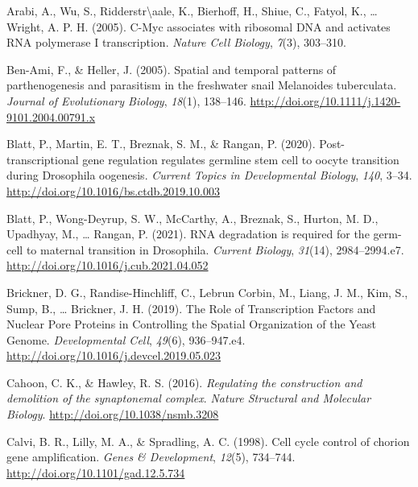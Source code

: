 \documentclass[12pt,oneside]{reedthesis}
\begin{document}
\leavevmode\hypertarget{ref-arabiCMycAssociatesRibosomal2005}{}%
Arabi, A., Wu, S., Ridderstr\textbackslash aale, K., Bierhoff, H., Shiue, C., Fatyol, K., \ldots{} Wright, A. P. H. (2005). C-Myc associates with ribosomal DNA and activates RNA polymerase I transcription. \emph{Nature Cell Biology}, \emph{7}(3), 303--310.

\leavevmode\hypertarget{ref-ben-amiSpatialTemporalPatterns2005}{}%
Ben-Ami, F., \& Heller, J. (2005). Spatial and temporal patterns of parthenogenesis and parasitism in the freshwater snail Melanoides tuberculata. \emph{Journal of Evolutionary Biology}, \emph{18}(1), 138--146. \url{http://doi.org/10.1111/j.1420-9101.2004.00791.x}

\leavevmode\hypertarget{ref-blattPosttranscriptionalGeneRegulation2020}{}%
Blatt, P., Martin, E. T., Breznak, S. M., \& Rangan, P. (2020). Post-transcriptional gene regulation regulates germline stem cell to oocyte transition during Drosophila oogenesis. \emph{Current Topics in Developmental Biology}, \emph{140}, 3--34. \url{http://doi.org/10.1016/bs.ctdb.2019.10.003}

\leavevmode\hypertarget{ref-blattRNADegradationRequired2021}{}%
Blatt, P., Wong-Deyrup, S. W., McCarthy, A., Breznak, S., Hurton, M. D., Upadhyay, M., \ldots{} Rangan, P. (2021). RNA degradation is required for the germ-cell to maternal transition in Drosophila. \emph{Current Biology}, \emph{31}(14), 2984--2994.e7. \url{http://doi.org/10.1016/j.cub.2021.04.052}

\leavevmode\hypertarget{ref-bricknerRoleTranscriptionFactors2019}{}%
Brickner, D. G., Randise-Hinchliff, C., Lebrun Corbin, M., Liang, J. M., Kim, S., Sump, B., \ldots{} Brickner, J. H. (2019). The Role of Transcription Factors and Nuclear Pore Proteins in Controlling the Spatial Organization of the Yeast Genome. \emph{Developmental Cell}, \emph{49}(6), 936--947.e4. \url{http://doi.org/10.1016/j.devcel.2019.05.023}

\leavevmode\hypertarget{ref-cahoonRegulatingConstructionDemolition2016}{}%
Cahoon, C. K., \& Hawley, R. S. (2016). \emph{Regulating the construction and demolition of the synaptonemal complex}. \emph{Nature Structural and Molecular Biology}. \url{http://doi.org/10.1038/nsmb.3208}

\leavevmode\hypertarget{ref-calviCellCycleControl1998}{}%
Calvi, B. R., Lilly, M. A., \& Spradling, A. C. (1998). Cell cycle control of chorion gene amplification. \emph{Genes \& Development}, \emph{12}(5), 734--744. \url{http://doi.org/10.1101/gad.12.5.734}
\end{document}
